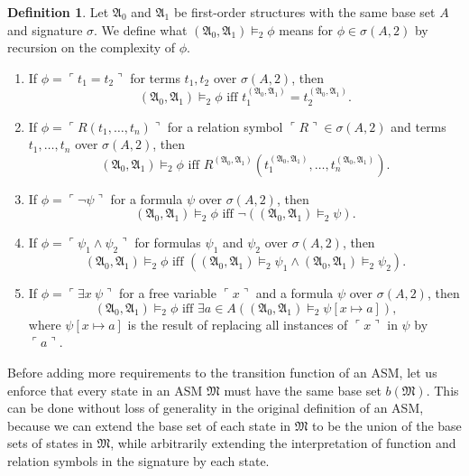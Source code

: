 \documentclass[12pt, twoside]{memoir}
\numberwithin{equation}{section}
\theoremstyle{definition}
\newtheorem{defi}[thm]{Definition}
\theoremstyle{remark}
\theoremstyle{definition}
\theoremstyle{definition}
\theoremstyle{definition}
\theoremstyle{remark}
\begin{document}
\begin{defi}
Let $\mathfrak{A}_0$ and $\mathfrak{A}_1$ be first-order structures with the same base set $A$ and signature $\sigma$. We define what $(\mathfrak{A}_0, \mathfrak{A}_1) \models_2 \phi$ means for $\phi \in \sigma(A, 2)$ by recursion on the complexity of $\phi$.
\begin{enumerate}[label=(\arabic*)]
    \item If $\phi = \ulcorner t_1 = t_2 \urcorner$ for terms $t_1, t_2$ over $\sigma(A, 2)$, then $$(\mathfrak{A}_0, \mathfrak{A}_1) \models_2 \phi \text{ iff } t_1^{(\mathfrak{A}_0, \mathfrak{A}_1)} = t_2^{(\mathfrak{A}_0, \mathfrak{A}_1)} \text{.}$$
    \item If $\phi = \ulcorner R(t_1, \dots, t_n) \urcorner$ for a relation symbol $\ulcorner R \urcorner \in \sigma(A, 2)$ and terms $t_1, \dots, t_n$ over $\sigma(A, 2)$, then $$(\mathfrak{A}_0, \mathfrak{A}_1) \models_2 \phi \text{ iff } R^{(\mathfrak{A}_0, \mathfrak{A}_1)} (t_1^{(\mathfrak{A}_0, \mathfrak{A}_1)}, \dots, t_n^{(\mathfrak{A}_0, \mathfrak{A}_1)}) \text{.}$$
    \item If $\phi = \ulcorner \neg \psi \urcorner$ for a formula $\psi$ over $\sigma(A, 2)$, then $$(\mathfrak{A}_0, \mathfrak{A}_1) \models_2 \phi \text{ iff } \neg ((\mathfrak{A}_0, \mathfrak{A}_1) \models_2 \psi) \text{.}$$
    \item If $\phi = \ulcorner \psi_1 \wedge \psi_2 \urcorner$ for formulas $\psi_1$ and $\psi_2$ over $\sigma(A, 2)$, then $$(\mathfrak{A}_0, \mathfrak{A}_1) \models_2 \phi \text{ iff } ((\mathfrak{A}_0, \mathfrak{A}_1) \models_2 \psi_1 \wedge (\mathfrak{A}_0, \mathfrak{A}_1) \models_2 \psi_2) \text{.}$$
    \item If $\phi = \ulcorner \exists x \ \psi \urcorner$ for a free variable $\ulcorner x \urcorner$ and a formula $\psi$ over $\sigma(A, 2)$, then $$(\mathfrak{A}_0, \mathfrak{A}_1) \models_2 \phi \text{ iff } \exists a \in A ((\mathfrak{A}_0, \mathfrak{A}_1) \models_2 \psi[x \mapsto a]) \text{,}$$ where $\psi[x \mapsto a]$ is the result of replacing all instances of $\ulcorner x \urcorner$ in $\psi$ by $\ulcorner a \urcorner$.
\end{enumerate}
\end{defi}

Before adding more requirements to the transition function of an ASM, let us enforce that every state in an ASM $\mathfrak{M}$ must have the same base set $b(\mathfrak{M})$. This can be done without loss of generality in the original definition of an ASM, because we can extend the base set of each state in $\mathfrak{M}$ to be the union of the base sets of states in $\mathfrak{M}$, while arbitrarily extending the interpretation of function and relation symbols in the signature by each state.
\end{document}
